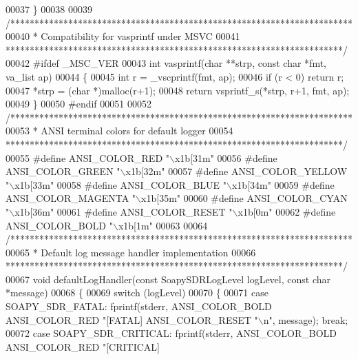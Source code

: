 \begin{DoxyCode}
00037 \}
00038 
00039 \textcolor{comment}{/***********************************************************************}
00040 \textcolor{comment}{ * Compatibility for vasprintf under MSVC}
00041 \textcolor{comment}{ **********************************************************************/}
00042 \textcolor{preprocessor}{#ifdef \_MSC\_VER}
00043 \textcolor{keywordtype}{int} vasprintf(\textcolor{keywordtype}{char} **strp, \textcolor{keyword}{const} \textcolor{keywordtype}{char} *fmt, va\_list ap)
00044 \{
00045     \textcolor{keywordtype}{int} r = \_vscprintf(fmt, ap);
00046     \textcolor{keywordflow}{if} (r < 0) \textcolor{keywordflow}{return} r;
00047     *strp = (\textcolor{keywordtype}{char} *)malloc(r+1);
00048     \textcolor{keywordflow}{return} vsprintf\_s(*strp, r+1, fmt, ap);
00049 \}
00050 \textcolor{preprocessor}{#endif}
00051 
00052 \textcolor{comment}{/***********************************************************************}
00053 \textcolor{comment}{ * ANSI terminal colors for default logger}
00054 \textcolor{comment}{ **********************************************************************/}
00055 \textcolor{preprocessor}{#define ANSI\_COLOR\_RED     "\(\backslash\)x1b[31m"}
00056 \textcolor{preprocessor}{#define ANSI\_COLOR\_GREEN   "\(\backslash\)x1b[32m"}
00057 \textcolor{preprocessor}{#define ANSI\_COLOR\_YELLOW  "\(\backslash\)x1b[33m"}
00058 \textcolor{preprocessor}{#define ANSI\_COLOR\_BLUE    "\(\backslash\)x1b[34m"}
00059 \textcolor{preprocessor}{#define ANSI\_COLOR\_MAGENTA "\(\backslash\)x1b[35m"}
00060 \textcolor{preprocessor}{#define ANSI\_COLOR\_CYAN    "\(\backslash\)x1b[36m"}
00061 \textcolor{preprocessor}{#define ANSI\_COLOR\_RESET   "\(\backslash\)x1b[0m"}
00062 \textcolor{preprocessor}{#define ANSI\_COLOR\_BOLD    "\(\backslash\)x1b[1m"}
00063 
00064 \textcolor{comment}{/***********************************************************************}
00065 \textcolor{comment}{ * Default log message handler implementation}
00066 \textcolor{comment}{ **********************************************************************/}
00067 \textcolor{keywordtype}{void} defaultLogHandler(\textcolor{keyword}{const} SoapySDRLogLevel logLevel, \textcolor{keyword}{const} \textcolor{keywordtype}{char} *message)
00068 \{
00069     \textcolor{keywordflow}{switch} (logLevel)
00070     \{
00071     \textcolor{keywordflow}{case} SOAPY_SDR_FATAL:    fprintf(stderr, ANSI_COLOR_BOLD ANSI_COLOR_RED \textcolor{stringliteral}{"[FATAL] %
      ANSI_COLOR_RESET \textcolor{stringliteral}{"\(\backslash\)n"}, message); \textcolor{keywordflow}{break};
00072     \textcolor{keywordflow}{case} SOAPY_SDR_CRITICAL: fprintf(stderr, ANSI_COLOR_BOLD ANSI_COLOR_RED \textcolor{stringliteral}{"[CRITICAL] %
}}
\end{DoxyCode}
